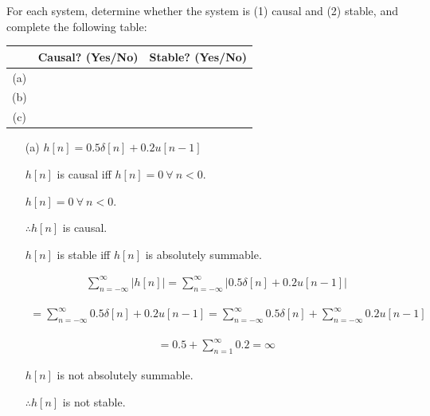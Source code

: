 \documentclass[fleqn]{article}
\begin{document}
\begin{enumerate}
\begin{enumerate}
			\end{enumerate}
			
			For each system, determine whether the system is (1) causal and (2) stable, and complete the following table:
			
			\begin{center}
				\begin{tabular}{|c|c|c|}
					\hline
					& Causal? (Yes/No) & Stable? (Yes/No) \\
					\hline
					(a) & & \\
					\hline
					(b) & & \\
					\hline
					(c) & & \\
					\hline
				\end{tabular}
			\end{center}
			
			\begin{enumerate}
				\item[(a)] $h[n] = 0.5\delta[n] + 0.2u[n-1]$
				
				$h[n]$ is causal iff $h[n] = 0\ \forall\ n < 0$.
				
				$h[n] = 0\ \forall\ n < 0$.
				
				$\therefore h[n]$ is causal.
				
				$h[n]$ is stable iff $h[n]$ is absolutely summable.
				
				\begin{align*}
					\sum_{n=-\infty}^{\infty}{|h[n]|} = \sum_{n=-\infty}^{\infty}{|0.5\delta[n] + 0.2u[n-1]|}
				\end{align*}
				
				\begin{align*}
					 = \sum_{n=-\infty}^{\infty}{0.5\delta[n] + 0.2u[n-1]} = \sum_{n=-\infty}^{\infty}{0.5\delta[n]} + \sum_{n=-\infty}^{\infty}{0.2u[n-1]}
				\end{align*}
				
				\begin{align*}
					= 0.5 + \sum_{n=1}^{\infty}{0.2} = \infty
				\end{align*}
				
				$h[n]$ is not absolutely summable.
				
				$\therefore h[n]$ is not stable.
			\end{enumerate}
			
	\end{enumerate}
	
\end{document}
